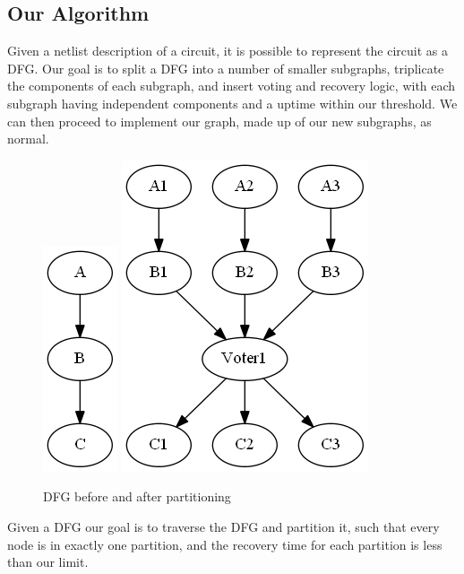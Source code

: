 \documentclass[12pt,drafta4paper,oneside]{memoir} %
\begin{document}
\subsection{Our Algorithm}\label{Algorithm}
Given a netlist description of a circuit, it is possible to represent the circuit as a \ac{DFG}\cite{FPGAArch}. Our goal is to split a \ac{DFG} into a number of smaller subgraphs, triplicate the components of each subgraph, and insert voting and recovery logic, with each subgraph having independent components and a \ac{uptime} within our threshold. We can then proceed to implement our graph, made up of our new subgraphs, as normal.
\begin{figure}
    \includegraphics[height=0.2\textheight]{images/TMR-graph.png}
    \includegraphics[height=0.2\textheight]{images/TMR-post.png}
    \caption{\ac{DFG} before and after partitioning}
    \label{TMRFigure}
\end{figure}
Given a \ac{DFG} our goal is to traverse the \ac{DFG} and partition it, such that every node is in exactly one partition, and the recovery time for each partition is less than our limit.
\end{document}
